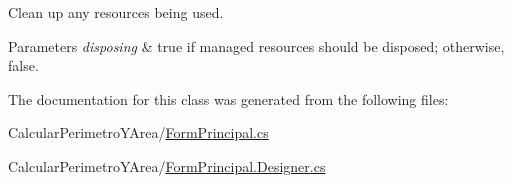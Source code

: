 Clean up any resources being used. 


\begin{DoxyParams}{Parameters}
{\em disposing} & true if managed resources should be disposed; otherwise, false.\\
\hline
\end{DoxyParams}


The documentation for this class was generated from the following files\+:\begin{DoxyCompactItemize}
\item 
Calcular\+Perimetro\+Y\+Area/\hyperlink{_form_principal_8cs}{Form\+Principal.\+cs}\item 
Calcular\+Perimetro\+Y\+Area/\hyperlink{_form_principal_8_designer_8cs}{Form\+Principal.\+Designer.\+cs}\end{DoxyCompactItemize}

